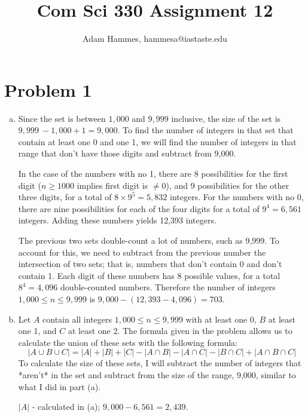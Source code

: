 \documentclass[11pt]{article}
\begin{document}
\let\iff\leftrightarrow

\title{Com Sci 330 Assignment 12}
\author{Adam Hammes, hammesa@iastaste.edu}
\maketitle


\section*{Problem 1}
\begin{enumerate}[(a)]
	\item	
	Since the set is between $1,000$ and $9,999$ inclusive, the size of the set is $9,999\ -1,000 +1 = 9,000$. To find the number of integers in that set that contain at least one 0 and one 1, we will find the number of integers in that range that don't have those digits and subtract from 9,000.
	
	In the case of the numbers with no 1, there are 8 possibilities for the first digit ($n \ge 1000$ implies first digit is $\neq 0$), and 9 possibilities for the other three digits, for a total of $8 \times 9^5 = 5,832$ integers. For the numbers with no 0, there are nine possibilities for each of the four digits for a total of $9^4 = 6,561$ integers. Adding these numbers yields 12,393 integers.
	
	The previous two sets double-count a lot of numbers, such as 9,999. To account for this, we need to subtract from the previous number the intersection of two sets; that is, numbers that don't contain 0 and don't contain 1. Each digit of these numbers has 8 possible values, for a total $8^4 = 4,096$ double-counted numbers. Therefore the number of integers $1,000 \le n \le 9,999$ is $9,000 -(12,393 - 4,096) = 703$.

	\item
	Let $A$ contain all integers $1,000 \le n \le 9,999$ with at least one 0, $B$ at least one 1, and $C$ at least one 2. The formula given in the problem allows us to calculate the union of these sets with the following formula:
	\begin{equation}
	|A \cup B \cup C| = |A| + |B| + |C| - |A \cap B| - |A \cap C| - |B \cap C| + |A \cap B \cap C|
	\end{equation}
	To calculate the size of these sets, I will subtract the number of integers that *aren't* in the set and subtract from the size of the range, 9,000, similar to what I did in part (a).
	
	$|A|$ - calculated in (a); $9,000 - 6,561 = 2,439$.
	

\end{enumerate}
\end{document}
